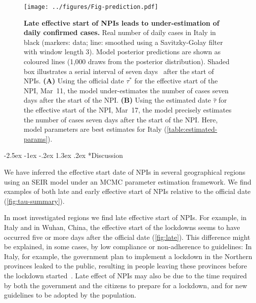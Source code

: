 \documentclass[12pt]{extarticle}
\makeatletter
\renewcommand\section{\@startsection {section}{1}{\z@}%
     {-2.5ex \@plus -1ex \@minus -.2ex}%
     {1.3ex \@plus.2ex}%
    {\Large\bfseries}}
\makeatother
\begin{document}
\begin{figure}[h]
    \centering
    \texttt{[image: ../figures/Fig-prediction.pdf]}
    \caption{
    \textbf{Late effective start of NPIs leads to under-estimation of daily confirmed cases.}
    Real number of daily cases in Italy in black (markers: data; line: smoothed using a Savitzky-Golay filter with window length 3).
    Model posterior predictions are shown as coloured lines (1,000 draws from the posterior distribution).
    Shaded box illustrates a serial interval of seven days~\citep{Ali2020} after the start of NPIs.
    \textbf{(A)} Using the official date $\tau^*$ for the effective start of the NPI, Mar~11, the model under-estimates the number of cases seven days after the start of the NPI.
    \textbf{(B)} Using the estimated date $\hat{\tau}$ for the effective start of the NPI, Mar~17, the model precisely estimates the number of cases seven days after the start of the NPI.
    Here, model parameters are best estimates for Italy (\autoref{table:estimated-params}).
    }
    \label{fig:prediction}
\end{figure}


\pagebreak
\section*{Discussion}

We have inferred the effective start date of NPIs in several geographical regions using an SEIR model under an MCMC parameter estimation framework.
We find examples of both late and early effective start of NPIs relative to the official date (\autoref{fig:tau-summary}).

In most investigated regions we find late effective start of NPIs.
For example, in Italy and in Wuhan, China, the effective start of the lockdowns seems to have occurred five or more days after the official date (\autoref{fig:late}).
This difference might be explained, in some cases, by low compliance or non-adherence to guidelines: In Italy, for example, the government plan to implement a lockdown in the Northern provinces leaked to the public, resulting in people leaving these provinces before the lockdown started~\citep{Gatto2020}.
Late effect of NPIs may also be due to the time required by both the government and the citizens to prepare for a lockdown, and for new guidelines to be adopted by the population.
 
\end{document}
